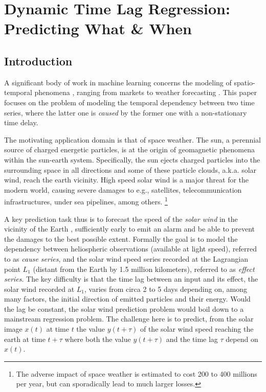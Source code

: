 \chapter{Dynamic Time Lag Regression: Predicting What \& When}\label{chapter:pdt}

\section{Introduction}\label{sec:intro}
A significant body of work in machine learning concerns the modeling of spatio-temporal phenomena \citep{SurveyST,NIPSForecasting18}, 
ranging from markets \citep{Pedreschi} to weather forecasting \citep{Horvitz}.
This paper focuses on the problem of modeling the temporal dependency between two time series, 
where the latter one is {\em caused} by the former one \citep{Granger} with a non-stationary time delay. 

The motivating application domain is that of space weather. The sun, a perennial source of charged energetic particles, 
is at the origin of geomagnetic phenomena within the sun-earth system. Specifically, the sun ejects 
charged particles into the surrounding space in all directions and some of these particle clouds, a.k.a. solar wind, 
reach the earth vicinity. High speed solar wind is a major threat for the modern world, causing severe damages to 
e.g., satellites, telecommunication infrastructures, under sea pipelines, among others.
\footnote{The adverse impact of space weather is estimated to cost 200 to 400 millions per year, 
but can sporadically lead to much larger losses.} 

A key prediction task thus is to forecast the speed of the \emph{solar wind} in the vicinity of the Earth 
\citep{doi:10.1002/jgra.50429,doi:10.1029/2009SW000542}, sufficiently early to emit an alarm and be able to prevent 
the damages to the best possible extent. Formally the goal is to model the dependency between heliospheric 
observations (available at light speed), referred to as {\em cause series}, and the solar wind speed series recorded at the 
Lagrangian point $L_1$ (distant from the Earth by 1.5 million kilometers), referred to as {\em effect series}. The 
key difficulty is that the time lag between an input and its effect, the solar wind recorded at $L_1$, varies from circa 2 to 5 days
depending on, among many factors, the initial direction of emitted particles and their energy. Would the lag be constant, the solar wind 
prediction problem would boil down to a mainstream regression problem. The challenge here is to predict, from the solar image $x(t)$ at time $t$ the 
value $y(t+\tau)$ of the solar wind speed reaching the earth at time $t+\tau$ where both the value $y(t+\tau)$ and the time lag $\tau$ depend on $x(t)$.

